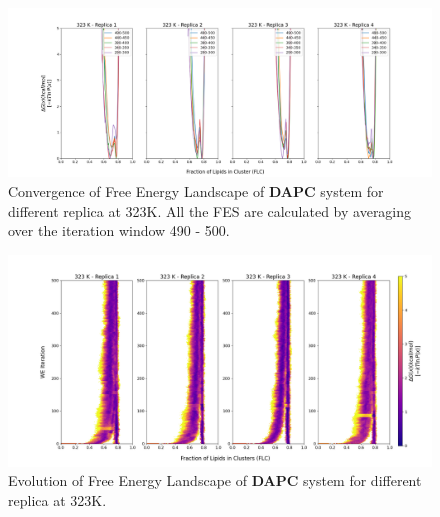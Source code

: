 \documentclass{biophys-new}
\begin{document}
\begin{figure}[hbt!]
\centering
\includegraphics[width=1.1\linewidth]{all_plots/ClusterLipids2Total/DPPC_DAPC_CHOL/323K/Convergence_DAPC_323_ClusterLipids2Total.png}
\caption{Convergence of Free Energy Landscape of \textbf{DAPC} system for different replica at 323K. All the FES are calculated by averaging over the iteration window 490 - 500.}
\label{fig:view}

\end{figure}

\begin{figure}[hbt!]
\centering
\includegraphics[width=1.1\linewidth]{all_plots/ClusterLipids2Total/DPPC_DAPC_CHOL/323K/Evolution_DAPC_323_ClusterLipids2Total.png}
\caption{Evolution of Free Energy Landscape of \textbf{DAPC} system for different replica at 323K.}
\label{fig:view}

\end{figure}
\end{document}
